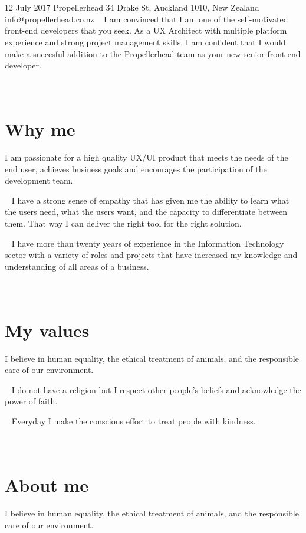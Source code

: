 \documentclass{resume}
\begin{document}



\section{\\ }
  \role{}{}
  12 July 2017
  Propellerhead
  34 Drake St, Auckland 1010, New Zealand
  info@propellerhead.co.nz
  ~
  I am convinced that I am one of the self-motivated front-end developers that you seek. As a UX Architect with multiple platform experience and strong project management skills, I am confident that I would make a succesful addition to the Propellerhead team as your new senior front-end developer.
  \par

\section{\\ Why me}
  \role{}{}
  I am passionate for a high quality UX/UI product that meets the needs of the end user, achieves business goals and encourages the participation of the development team.\par
  ~
  I have a strong sense of empathy that has given me the ability to learn what the users need, what the users want, and the capacity to differentiate between them. That way I can deliver the right tool for the right solution.\par
  ~
  I have more than twenty years of experience in the Information Technology sector with a variety of roles and projects that have increased my knowledge and understanding of all areas of a business.\par

\section{\\ My values}
  \role{}{}
  I believe in human equality, the ethical treatment of animals, and the responsible care of our environment.\par
  ~
  I do not have a religion but I respect other people's beliefs and acknowledge the power of faith.\par
  ~
  Everyday I make the conscious effort to treat people with kindness.\par

\section{\\ About me}
  \role{}{}
  I believe in human equality, the ethical treatment of animals, and the responsible care of our environment.\par

%
%
\end{document}
